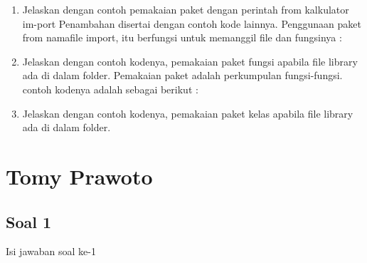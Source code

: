 \begin{enumerate}
\item Jelaskan dengan contoh pemakaian paket dengan perintah from kalkulator im-port Penambahan disertai dengan contoh kode lainnya.
    Penggunaan paket from namafile import, itu berfungsi untuk memanggil file dan fungsinya :
    

\item Jelaskan dengan contoh kodenya, pemakaian paket fungsi apabila file library ada di dalam folder.
    Pemakaian paket adalah perkumpulan fungsi-fungsi. contoh kodenya adalah sebagai berikut :

\item Jelaskan dengan contoh kodenya, pemakaian paket kelas apabila file library ada di dalam folder.
    

\end{enumerate}

\section{Tomy Prawoto}
\subsection{Soal 1}
Isi jawaban soal ke-1


